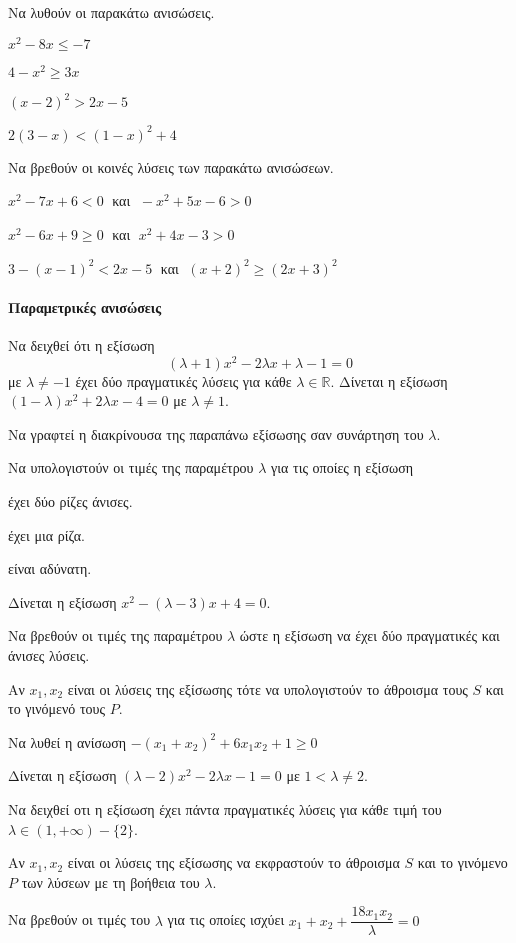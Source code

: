 \documentclass[11pt,a4paper,modern]{FFExercises}
\begin{document}
\askhsh Να λυθούν οι παρακάτω ανισώσεις.
\begin{alist}
\item $ x^2-8x\leq -7 $
\item $ 4-x^2\geq 3x $
\item $ (x-2)^2>2x-5 $
\item $ 2(3-x)<(1-x)^2+4 $
\end{alist}
\askhsh Να βρεθούν οι κοινές λύσεις των παρακάτω ανισώσεων.
\begin{alist}
\item $ x^2-7x+6<0 \;$ και $\; -x^2+5x-6>0 $
\item $ x^2-6x+9\geq0 \;$ και $\; x^2+4x-3>0 $
\item $ 3-(x-1)^2<2x-5 \;$ και $\; (x+2)^2\geq(2x+3)^2 $
\end{alist}
\paragraph{Παραμετρικές ανισώσεις}
\askhsh Να δειχθεί ότι η εξίσωση \[ (\lambda+1)x^2-2\lambda x+\lambda-1=0 \] με $ \lambda\neq-1 $ έχει δύο πραγματικές λύσεις για κάθε $ \lambda\in\mathbb{R} $.
\askhsh Δίνεται η εξίσωση $ (1-\lambda)x^2+2\lambda x-4=0 $ με $ \lambda\neq1 $.
\begin{alist}
\item Να γραφτεί η διακρίνουσα της παραπάνω εξίσωσης σαν συνάρτηση του $ \lambda $.
\item Να υπολογιστούν οι τιμές της παραμέτρου $ \lambda $ για τις οποίες η εξίσωση
\begin{rlist}
\item έχει δύο ρίζες άνισες.
\item έχει μια ρίζα.
\item είναι αδύνατη.
\end{rlist}
\end{alist}
\askhsh Δίνεται η εξίσωση $ x^2-(\lambda-3)x+4=0 $.
\begin{alist}
\item Να βρεθούν οι τιμές της παραμέτρου $ \lambda $ ώστε η εξίσωση να έχει δύο πραγματικές και άνισες λύσεις.
\item Αν $ x_1, x_2 $ είναι οι λύσεις της εξίσωσης τότε να υπολογιστούν το άθροισμα τους $ S $ και το γινόμενό τους $ P $.
\item Να λυθεί η ανίσωση $ -(x_1+x_2)^2+6x_1x_2+1\geq0 $
\end{alist}
\askhsh Δίνεται η εξίσωση $ (\lambda-2) x^2-2\lambda x-1=0 $ με $ 1<\lambda\neq2 $.
\begin{alist}
\item Να δειχθεί οτι η εξίσωση έχει πάντα πραγματικές λύσεις για κάθε τιμή του $ \lambda\in(1,+\infty)-\{2\} $.
\item Αν $ x_1, x_2 $ είναι οι λύσεις της εξίσωσης να εκφραστούν το άθροισμα $ S $ και το γινόμενο $ P $ των λύσεων με τη βοήθεια του $ \lambda $.
\item Να βρεθούν οι τιμές του $ \lambda $ για τις οποίες ισχύει $ x_1+x_2+\dfrac{18x_1x_2}{\lambda}=0 $
\end{alist}
\end{document}
